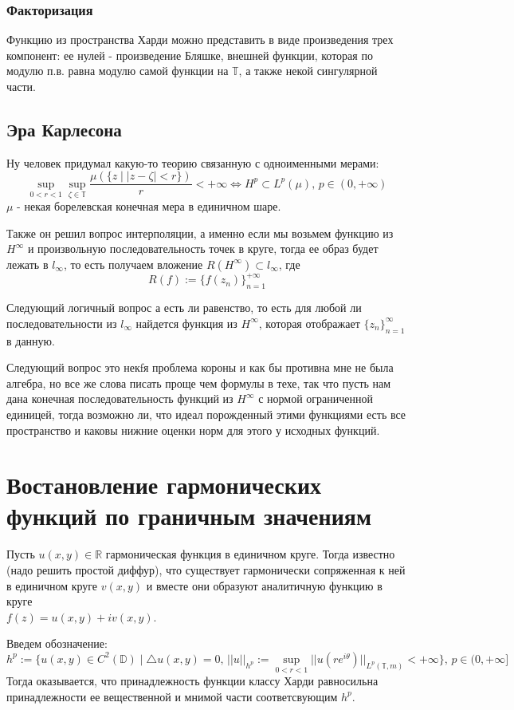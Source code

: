 \documentclass[12pt,a4paper]{article} %
\newcommand{\R}{\mathbb{R}}
\newcommand{\D}{\mathbb{D}}
\newcommand{\T}{\mathbb{T}}
\begin{document}
	\subsubsection{Факторизация}
	Функцию из пространства Харди можно представить в виде произведения трех компонент: ее нулей - произведение Бляшке, внешней функции, которая по модулю п.в. равна модулю самой функции на $\T$, а также некой сингулярной части.
	\subsection{Эра Карлесона}
	Ну человек придумал какую-то теорию связанную с одноименными мерами:
	$$\sup\limits_{0<r<1}\sup\limits_{\zeta\in\T}\frac{\mu(\{z\mid|z-\zeta|<r\})}{r}<+\infty\Leftrightarrow H^p\subset L^p(\mu),\,p\in(0,+\infty)$$
	$\mu$ - некая борелевская конечная мера в единичном шаре.
	
	Также он решил вопрос интерполяции, а именно если мы возьмем функцию из $H^{\infty}$ и произвольную последовательность точек в круге, тогда ее образ будет лежать в $l_{\infty}$, то есть получаем вложение $R(H^{\infty})\subset l_{\infty}$, где
	$$R(f):=\{f(z_n)\}_{n=1}^{+\infty}$$
	
	Следующий логичный вопрос а есть ли равенство, то есть для любой ли последовательности из $l_{\infty}$ найдется функция из $H^{\infty}$, которая отображает $\{z_n\}_{n=1}^{\infty}$ в данную.
	
	Следующий вопрос это некfя проблема короны и как бы противна мне не была алгебра, но все же слова писать проще чем формулы в техе, так что пусть нам дана конечная последовательность функций из $H^{\infty}$ с нормой ограниченной единицей, тогда возможно ли, что идеал порожденный этими функциями есть все пространство и каковы нижние оценки норм для этого у исходных функций.
	\section{Востановление гармонических функций по граничным значениям}
	Пусть $u(x,y)\in\R$ гармоническая функция в единичном круге. Тогда известно (надо решить простой диффур), что существует гармонически сопряженная к ней в единичном круге $v(x,y)$ и вместе они образуют аналитичную функцию в круге\\ $f(z)=u(x,y)+iv(x,y)$.
	
	Введем обозначение:
	$$h^p:=\{u(x,y)\in C^2(\D)\mid\triangle u(x,y)=0,\,||u||_{h^p}:=\sup\limits_{0<r<1}||u(re^{i\theta})||_{L^p(\T,m)}<+\infty\},\,p\in(0,+\infty]$$
	Тогда оказывается, что принадлежность функции классу Харди равносильна принадлежности ее вещественной и мнимой части соответсвующим $h^p$.
	
\end{document}
